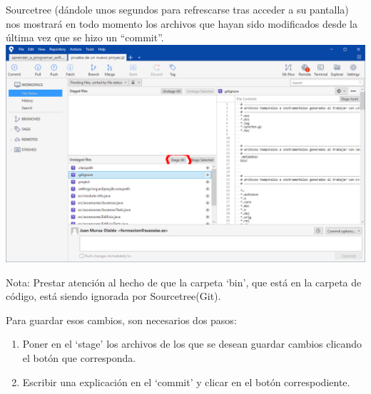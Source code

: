 \documentclass[spanish,12pt,a4paper,final,oneside]{book}
\begin{document}
Sourcetree (dándole unos segundos para refrescarse tras acceder a su pantalla) nos mostrará en todo momento los archivos que hayan sido modificados desde la última vez que se hizo un ``commit''.
\\ \includegraphics[width=\textwidth]{Sourcetree - stage all}
\begin{small}Nota: Prestar atención al hecho de que la carpeta `bin', que está en la carpeta de código, está siendo ignorada por Sourcetree(Git).\end{small}

Para guardar esos cambios, son necesarios dos pasos:
\begin{enumerate}
\item Poner en el `stage' los archivos de los que se desean guardar cambios clicando el botón que corresponda.
\item Escribir una explicación en el `commit' y clicar en el botón correspodiente.
\end{enumerate}
\end{document}
